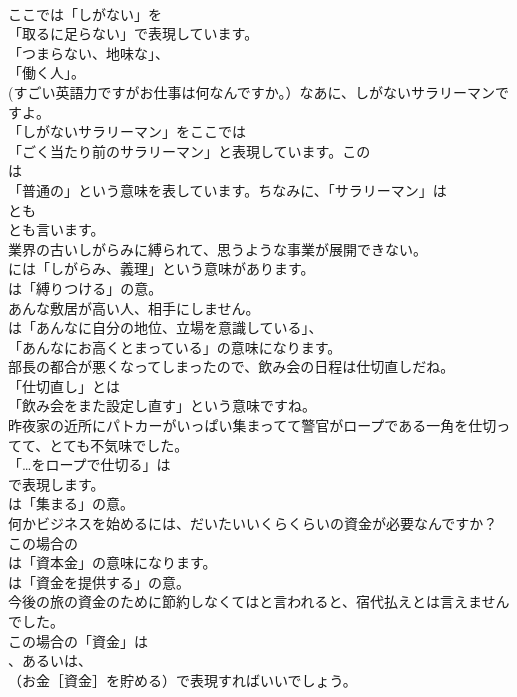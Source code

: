 \documentclass[8pt]{extreport}
\begin{document}
\begin{CJK}{UTF8}{min}
\\	ここでは「しがない」を
\\	「取るに足らない」で表現しています。
\\	「つまらない、地味な」、
\\	「働く人」。	
\\	(すごい英語力ですがお仕事は何なんですか。）なあに、しがないサラリーマンですよ。 
\\	「しがないサラリーマン」をここでは
\\	「ごく当たり前のサラリーマン」と表現しています。この
\\	は
\\	「普通の」という意味を表しています。ちなみに、「サラリーマン」は
\\	とも
\\	とも言います。	
\\	業界の古いしがらみに縛られて、思うような事業が展開できない。 
\\	には「しがらみ、義理」という意味があります。
\\	は「縛りつける」の意。	
\\	あんな敷居が高い人、相手にしません。 
\\	は「あんなに自分の地位、立場を意識している」、
\\	「あんなにお高くとまっている」の意味になります。	
\\	部長の都合が悪くなってしまったので、飲み会の日程は仕切直しだね。 
\\	「仕切直し」とは
\\	「飲み会をまた設定し直す」という意味ですね。	
\\	昨夜家の近所にパトカーがいっぱい集まってて警官がロープである一角を仕切ってて、とても不気味でした。 
\\	「…をロープで仕切る」は 
\\	で表現します。
\\	は「集まる」の意。	
\\	何かビジネスを始めるには、だいたいいくらくらいの資金が必要なんですか？ 
\\	この場合の 
\\	は「資本金」の意味になります。
\\	は「資金を提供する」の意。	
\\	今後の旅の資金のために節約しなくてはと言われると、宿代払えとは言えませんでした。 
\\	この場合の「資金」は 
\\	、あるいは、
\\	（お金［資金］を貯める）で表現すればいいでしょう。	

\end{CJK}
\end{document}
